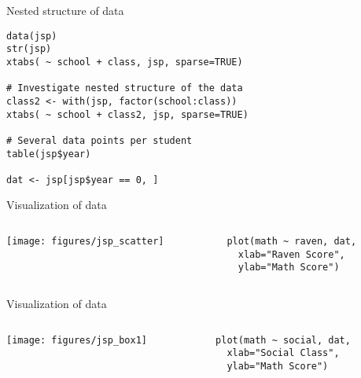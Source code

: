 \documentclass{beamer}
\begin{document}
{

\begin{frame}[fragile]{Nested structure of data}
  \begin{lstlisting}
data(jsp)
str(jsp)
xtabs( ~ school + class, jsp, sparse=TRUE)

# Investigate nested structure of the data
class2 <- with(jsp, factor(school:class))
xtabs( ~ school + class2, jsp, sparse=TRUE)

# Several data points per student
table(jsp$year)

dat <- jsp[jsp$year == 0, ]
  \end{lstlisting}
\end{frame}

}

\begin{frame}[fragile]{Visualization of data}
  \begin{columns}
    \begin{column}{6cm}
      \texttt{[image: figures/jsp\_scatter]}
    \end{column}
    \begin{column}{4cm}
      \begin{lstlisting}[style=plain]
plot(math ~ raven, dat,
  xlab="Raven Score", 
  ylab="Math Score")
      \end{lstlisting}
    \end{column}
  \end{columns}
\end{frame}

\begin{frame}[fragile]{Visualization of data}
  \begin{columns}
    \begin{column}{6cm}
      \texttt{[image: figures/jsp\_box1]}
    \end{column}
    \begin{column}{4cm}
      \begin{lstlisting}[style=plain]
plot(math ~ social, dat,
  xlab="Social Class",
  ylab="Math Score")
      \end{lstlisting}
    \end{column}
  \end{columns}
\end{frame}
\end{document}
